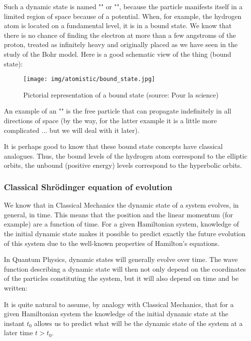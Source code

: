 	Such a dynamic state is named "" or "", because the particle manifests itself in a limited region of space because of a potential. When, for example, the hydrogen atom is located on a fundamental level, it is in a bound state. We know that there is no chance of finding the electron at more than a few angstroms of the proton, treated as infinitely heavy and originally placed as we have seen in the study of the Bohr model. Here is a good schematic view of the thing (bound state):
	\begin{figure}[H]
		\centering
		\texttt{[image: img/atomistic/bound\_state.jpg]}	
		\caption[Pictorial representation of a bound state]{Pictorial representation of a bound state (source: Pour la science)}
	\end{figure}
	An example of an "" is the free particle that can propagate indefinitely in all directions of space (by the way, for the latter example it is a little more complicated ... but we will deal with it later).
	\begin{tcolorbox}[title=Remark,colframe=black,arc=10pt]
	It is perhaps good to know that these bound state concepts have classical analogues. Thus, the bound levels of the hydrogen atom correspond to the elliptic orbits, the unbound (positive energy) levels correspond to the hyperbolic orbits.
	\end{tcolorbox}
	
	\subsubsection{Classical Shrödinger equation of evolution}
	We know that in Classical Mechanics the dynamic state of a system evolves, in general, in time. This means that the position and the linear momentum (for example) are a function of time. For a given Hamiltonian system, knowledge of the initial dynamic state makes it possible to predict exactly the future evolution of this system due to the well-known properties of Hamilton's equations.
	
	In Quantum Physics, dynamic states will generally evolve over time. The wave function describing a dynamic state will then not only depend on the coordinates of the particles constituting the system, but it will also depend on time and be written:
	
	It is quite natural to assume, by analogy with Classical Mechanics, that for a given Hamiltonian system the knowledge of the initial dynamic state at the instant $t_0$ allows us to predict what will be the dynamic state of the system at a later time $t>t_0$.
	
